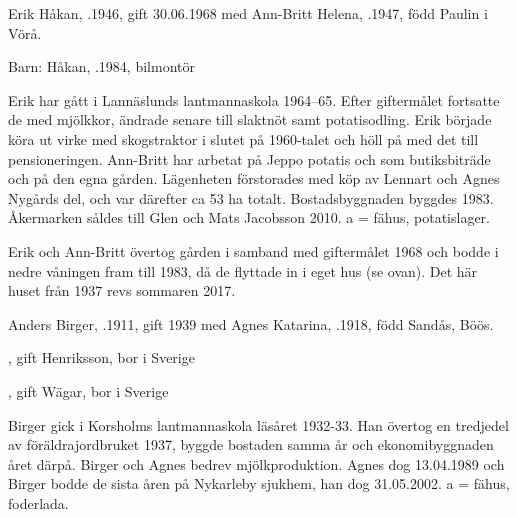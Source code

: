 
%
Erik Håkan, .1946, gift 30.06.1968 med Ann-Britt Helena, .1947, född Paulin i Vörå.

Barn:  Håkan, .1984, bilmontör

Erik har gått i Lannäslunds lantmannaskola 1964--65. Efter giftermålet fortsatte de med mjölkkor, ändrade senare till slaktnöt samt potatisodling. Erik började köra ut virke med skogstraktor i slutet på 1960-talet och höll på med det till pensioneringen. Ann-Britt har arbetat på Jeppo potatis och som butiksbiträde och på den egna gården. Lägenheten förstorades med köp av Lennart och Agnes Nygårds del, och var därefter ca 53 ha totalt. Bostadsbyggnaden byggdes 1983. Åkermarken såldes till Glen och Mats Jacobsson 2010. a = fähus, potatislager.



%



%
Erik och Ann-Britt övertog gården i samband med giftermålet 1968 och bodde i nedre våningen fram till 1983, då de flyttade in i eget hus (se ovan). Det här huset från 1937 revs sommaren 2017.\jhvspace{}



%
Anders Birger, .1911, gift 1939 med Agnes Katarina, .1918, född Sandås, Böös.
\begin{jhchildren}
  \item {}, gift Henriksson, bor i Sverige
  \item {}, gift Wägar, bor i Sverige
  \item {}
\end{jhchildren}
Birger gick i Korsholms lantmannaskola läsåret 1932-33. Han övertog en tredjedel av föräldrajordbruket 1937, byggde bostaden samma år och ekonomibyggnaden året därpå. Birger och Agnes bedrev mjölkproduktion. Agnes dog 13.04.1989 och Birger bodde de sista åren på Nykarleby sjukhem, han dog 31.05.2002. a = fähus, foderlada.




